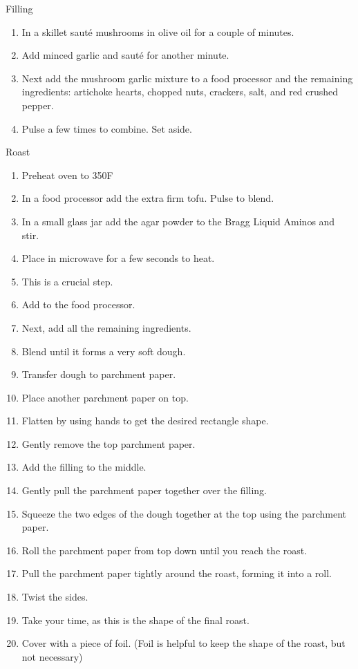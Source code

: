 \begin{footnotesize}

Filling
\begin{enumerate}
    \item In a skillet sauté mushrooms in olive oil for a couple of minutes.
    \item Add minced garlic and sauté for another minute.
    \item Next add the mushroom garlic mixture to a food processor and the remaining ingredients: artichoke hearts, chopped nuts, crackers, salt, and red crushed pepper.
    \item Pulse a few times to combine. Set aside.
\end{enumerate}

Roast
\begin{enumerate}
    \item Preheat oven to 350F
    \item In a food processor add the extra firm tofu. Pulse to blend.
    \item In a small glass jar add the agar powder to the Bragg Liquid Aminos and stir.
    \item Place in microwave for a few seconds to heat.
    \item This is a crucial step.
    \item Add to the food processor.
    \item Next, add all the remaining ingredients.

    \item Blend until it forms a very soft dough.
    \item Transfer dough to parchment paper.
    \item Place another parchment paper on top. 
    \item Flatten by using hands to get the desired rectangle shape. 
    \item Gently remove the top parchment paper.
    \item Add the filling to the middle. 
    \item Gently pull the parchment paper together over the filling. 
    \item Squeeze the two edges of the dough together at the top using the parchment paper. 
    \item Roll the parchment paper from top down until you reach the roast. 
    \item Pull the parchment paper tightly around the roast, forming it into a roll.
    \item Twist the sides. 
    \item Take your time, as this is the shape of the final roast.
    \item Cover with a piece of foil. (Foil is helpful to keep the shape of the roast, but not necessary)


\end{enumerate}
\end{footnotesize}
